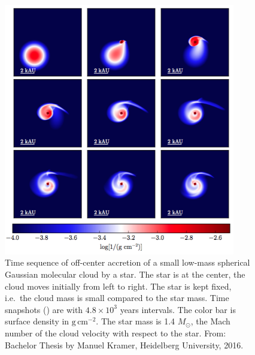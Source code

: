 \documentclass[10pt,fleqn,twoside]{article}
\begin{document}
\begin{figure}
\centerline{\includegraphics[width=0.9\textwidth]{D2Fig/Kramer_Fig4-1-eps-converted-to.pdf}}
\caption{\label{fig-kramer-4.1}Time sequence of off-center accretion of a
  small low-mass spherical Gaussian molecular cloud by a star. The star is
  at the center, the cloud moves initially from left to right. The star is
  kept fixed, i.e.~the cloud mass is small compared to the star mass. Time
  snapshots () are with
  $4.8\times 10^3$ years intervals. The color bar is surface density in
  $\mathrm{g}\,\mathrm{cm}^{-2}$. The star mass is 1.4 $M_{\odot}$, the Mach
  number of the cloud velocity with respect to the star. From: Bachelor
  Thesis by Manuel Kramer, Heidelberg University, 2016.}
\end{figure}
\end{document}
